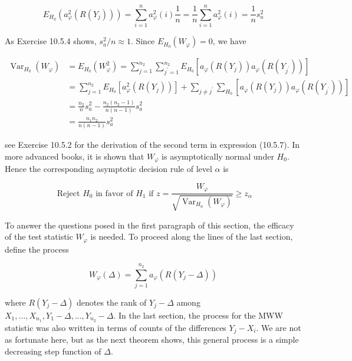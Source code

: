 \begin{equation*}
E_{H_{0}}\left(a_{\varphi}^{2}\left(R\left(Y_{j}\right)\right)\right)=\sum_{i=1}^{n} a_{\varphi}^{2}(i) \frac{1}{n}=\frac{1}{n} \sum_{i=1}^{n} a_{\varphi}^{2}(i)=\frac{1}{n} s_{a}^{2} \tag{10.5.6}
\end{equation*}


As Exercise 10.5.4 shows, $s_{a}^{2} / n \approx 1$. Since $E_{H_{0}}\left(W_{\varphi}\right)=0$, we have


\begin{align*}
\operatorname{Var}_{H_{0}}\left(W_{\varphi}\right) & =E_{H_{0}}\left(W_{\varphi}^{2}\right)=\sum_{j=1}^{n_{2}} \sum_{j^{\prime}=1}^{n_{2}} E_{H_{0}}\left[a_{\varphi}\left(R\left(Y_{j}\right)\right) a_{\varphi}\left(R\left(Y_{j^{\prime}}\right)\right)\right] \\
& =\sum_{j=1}^{n_{2}} E_{H_{0}}\left[a_{\varphi}^{2}\left(R\left(Y_{j}\right)\right)\right]+\sum_{j \neq j^{\prime}} \sum_{H_{0}}\left[a_{\varphi}\left(R\left(Y_{j}\right)\right) a_{\varphi}\left(R\left(Y_{j^{\prime}}\right)\right)\right] \\
& =\frac{n_{2}}{n} s_{a}^{2}-\frac{n_{2}\left(n_{2}-1\right)}{n(n-1)} s_{a}^{2}  \tag{10.5.7}\\
& =\frac{n_{1} n_{2}}{n(n-1)} s_{a}^{2} \tag{10.5.8}
\end{align*}


see Exercise 10.5.2 for the derivation of the second term in expression (10.5.7). In more advanced books, it is shown that $W_{\varphi}$ is asymptotically normal under $H_{0}$. Hence the corresponding asymptotic decision rule of level $\alpha$ is


\begin{equation*}
\text { Reject } H_{0} \text { in favor of } H_{1} \text { if } z=\frac{W_{\varphi}}{\sqrt{\operatorname{Var}_{H_{0}}\left(W_{\varphi}\right)}} \geq z_{\alpha} \tag{10.5.9}
\end{equation*}


To answer the questions posed in the first paragraph of this section, the efficacy of the test statistic $W_{\varphi}$ is needed. To proceed along the lines of the last section, define the process


\begin{equation*}
W_{\varphi}(\Delta)=\sum_{j=1}^{n_{2}} a_{\varphi}\left(R\left(Y_{j}-\Delta\right)\right) \tag{10.5.10}
\end{equation*}


where $R\left(Y_{j}-\Delta\right)$ denotes the rank of $Y_{j}-\Delta$ among $X_{1}, \ldots, X_{n_{1}}, Y_{1}-\Delta, \ldots, Y_{n_{2}}-\Delta$. In the last section, the process for the MWW statistic was also written in terms of counts of the differences $Y_{j}-X_{i}$. We are not as fortunate here, but as the next theorem shows, this general process is a simple decreasing step function of $\Delta$.

